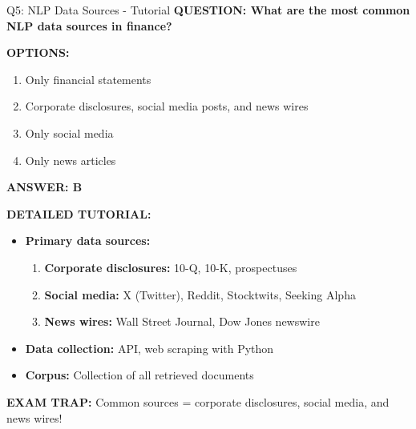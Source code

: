 \documentclass[8pt]{beamer}
\begin{document}
	\begin{frame}{Q5: NLP Data Sources - Tutorial}
		\fontsize{6.5}{7.5}\selectfont
		\textbf{QUESTION: What are the most common NLP data sources in finance?}
		
		\vspace{0.1cm}
		\textbf{OPTIONS:}
		\begin{enumerate}
			\item Only financial statements
			\item Corporate disclosures, social media posts, and news wires
			\item Only social media
			\item Only news articles
		\end{enumerate}
		
		\vspace{0.1cm}
		\textcolor{myblue}{\textbf{ANSWER: B}}
		
		\vspace{0.1cm}
		\textbf{DETAILED TUTORIAL:}
		\begin{itemize}
			\item \textbf{Primary data sources:}
			\begin{enumerate}
				\item \textbf{Corporate disclosures:} 10-Q, 10-K, prospectuses
				\item \textbf{Social media:} X (Twitter), Reddit, Stocktwits, Seeking Alpha
				\item \textbf{News wires:} Wall Street Journal, Dow Jones newswire
			\end{enumerate}
			\item \textbf{Data collection:} API, web scraping with Python
			\item \textbf{Corpus:} Collection of all retrieved documents
		\end{itemize}
		
		\textcolor{myred}{\textbf{EXAM TRAP:}} Common sources = \textcolor{myblue}{corporate disclosures, social media, and news wires}!
	\end{frame}
	
\end{document}
